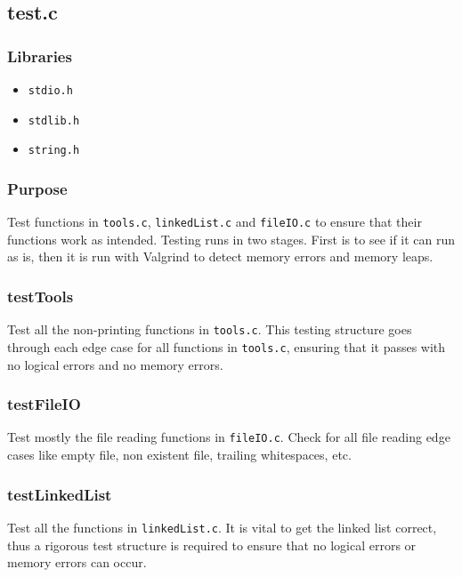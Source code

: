 \documentclass[a4paper, 12pt, titlepage]{article}
\newcommand{\code}[1]{\small\texttt{#1}\normalsize}
\begin{document}
\pagebreak
\subsection{test.c}
\subsubsection{Libraries}

\begin{itemize}[label={--}, noitemsep]
    \item \code{stdio.h}
    \item \code{stdlib.h}
    \item \code{string.h}
\end{itemize}

\subsubsection{Purpose}

Test functions in \code{tools.c}, \code{linkedList.c} and \code{fileIO.c} to
ensure that their functions work as intended. Testing runs in two stages.
First is to see if it can run as is, then it is run with Valgrind to detect
memory errors and memory leaps.

\subsubsection{testTools}

Test all the non-printing functions in \code{tools.c}. This testing structure
goes through each edge case for all functions in \code{tools.c}, ensuring
that it passes with no logical errors and no memory errors.

\subsubsection{testFileIO}

Test mostly the file reading functions in \code{fileIO.c}. Check for all
file reading edge cases like empty file, non existent file, trailing
whitespaces, etc.

\subsubsection{testLinkedList}

Test all the functions in \code{linkedList.c}. It is vital to get the linked
list correct, thus a rigorous test structure is required to ensure that no
logical errors or memory errors can occur.
\end{document}
